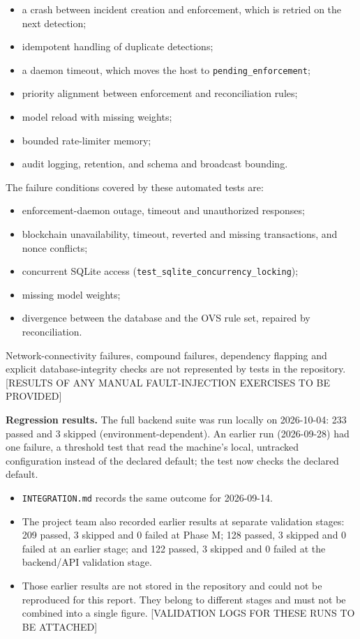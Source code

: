 \documentclass[12pt,a4paper]{report}
\begin{document}
\begin{itemize}
    \begin{itemize}
        \item a crash between incident creation and enforcement, which is retried on the next detection;
        \item idempotent handling of duplicate detections;
        \item a daemon timeout, which moves the host to \texttt{pending\_enforcement};
        \item priority alignment between enforcement and reconciliation rules;
        \item model reload with missing weights;
        \item bounded rate-limiter memory;
        \item audit logging, retention, and schema and broadcast bounding.
    \end{itemize}
\end{itemize}
The failure conditions covered by these automated tests are:
\begin{itemize}
    \item enforcement-daemon outage, timeout and unauthorized responses;
    \item blockchain unavailability, timeout, reverted and missing transactions, and nonce conflicts;
    \item concurrent SQLite access (\texttt{test\_sqlite\_concurrency\_locking});
    \item missing model weights;
    \item divergence between the database and the OVS rule set, repaired by reconciliation.
\end{itemize}
Network-connectivity failures, compound failures, dependency flapping and explicit database-integrity checks are not represented by tests in the repository. [RESULTS OF ANY MANUAL FAULT-INJECTION EXERCISES TO BE PROVIDED]

\par\textbf{Regression results.} The full backend suite was run locally on 2026-10-04: 233 passed and 3 skipped (environment-dependent). An earlier run (2026-09-28) had one failure, a threshold test that read the machine's local, untracked configuration instead of the declared default; the test now checks the declared default.
\begin{itemize}
    \item \texttt{INTEGRATION.md} records the same outcome for 2026-09-14.
    \item The project team also recorded earlier results at separate validation stages: 209 passed, 3 skipped and 0 failed at Phase M; 128 passed, 3 skipped and 0 failed at an earlier stage; and 122 passed, 3 skipped and 0 failed at the backend/API validation stage.
    \item Those earlier results are not stored in the repository and could not be reproduced for this report. They belong to different stages and must not be combined into a single figure. [VALIDATION LOGS FOR THESE RUNS TO BE ATTACHED]
\end{itemize}
\end{document}
